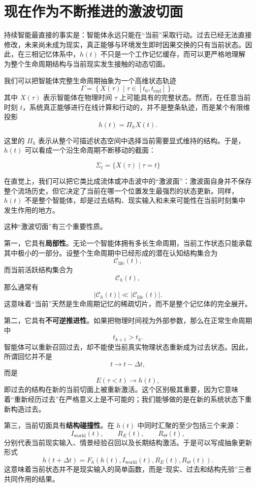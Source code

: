 \section{现在作为不断推进的激波切面}

持续智能最直接的事实是：智能体永远只能在“当前”采取行动。过去已经无法直接修改，未来尚未成为现实，真正能够与环境发生即时因果交换的只有当前状态。因此，在三相记忆体系中，\(h(t)\) 不只是一个工作记忆缓存，而可以更严格地理解为整个生命周期结构与当前现实发生接触的动态切面。

我们可以把智能体完整生命周期抽象为一个高维状态轨迹
\[
\Gamma
=
\left\{
X(\tau)
\mid
\tau\in[t_0,t_{\mathrm{end}}]
\right\},
\]
其中 \(X(\tau)\) 表示智能体在物理时间 \(\tau\) 上可能具有的完整状态。然而，在任意当前时刻 \(t\)，系统真正能够进行在线计算和行动的，并不是整条轨迹，而是某个有限维投影
\[
h(t)=\Pi_h X(t).
\]

这里的 \(\Pi_h\) 表示从整个可描述状态空间中选择当前需要显式维持的结构。于是，\(h(t)\) 可以看成一个沿生命周期不断移动的截面：

\[
\boxed{
\Sigma_t
=
\{X(\tau)\mid\tau=t\}
}
\]

在直觉上，我们可以把它类比成流体或冲击波中的“激波面”：激波面自身并不保存整个流场历史，但它决定了当前在哪一个位置发生最强烈的状态更新。同样，\(h(t)\) 不是整个智能体，却是过去结构、现实输入和未来可能性在当前时刻集中发生作用的地方。

这种“激波切面”有三个重要性质。

第一，它具有\textbf{局部性}。无论一个智能体拥有多长生命周期，当前工作状态只能承载其中极小的一部分。设整个生命周期中已经形成的潜在认知结构集合为
\[
\mathcal C_{\mathrm{life}}(t),
\]
而当前活跃结构集合为
\[
\mathcal C_h(t),
\]
那么通常有
\[
|\mathcal C_h(t)|
\ll
|\mathcal C_{\mathrm{life}}(t)|.
\]
这意味着“当前”天然是生命周期记忆的稀疏切片，而不是整个记忆体的完全展开。

第二，它具有\textbf{不可逆推进性}。如果把物理时间视为外部参数，那么在正常生命周期中
\[
t_{k+1}>t_k.
\]
智能体可以重新召回过去，却不能使当前真实物理状态重新成为过去状态。因此，所谓回忆并不是
\[
t\rightarrow t-\Delta t,
\]
而是
\[
E(\tau<t)\rightarrow h(t),
\]
即过去的结构在新的当前切面上被重新激活。这个区别极其重要，因为它意味着“重新经历过去”在严格意义上是不可能的；我们能够做的是在新的系统状态下重新构造过去。

第三，当前切面具有\textbf{结构碰撞性}。在 \(h(t)\) 中同时汇聚的至少包括三个来源：
\[
I_{\mathrm{world}}(t),
\qquad
R_E(t),
\qquad
R_\Theta(t),
\]
分别代表当前现实输入、情景经验召回以及长期结构激活。于是可以写成抽象更新形式
\[
h(t+\Delta t)
=
F_h
\left(
h(t),
I_{\mathrm{world}}(t),
R_E(t),
R_\Theta(t)
\right).
\]
这意味着当前状态并不是现实输入的简单函数，而是“现实、过去和结构先验”三者共同作用的结果。

